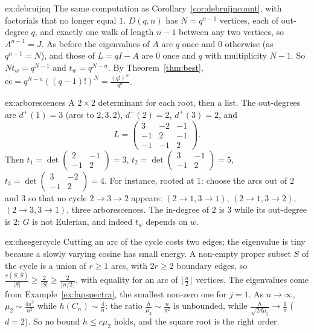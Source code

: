 \begin{solution}{ex:debruijnq}
\idea The same computation as Corollary~\ref{cor:debruijncount}, with factorials that no longer equal $1$.
\writeup $D(q,n)$ has $N=q^{n-1}$ vertices, each of out-degree $q$, and exactly one walk of length $n-1$ between any two vertices, so $A^{n-1}=J$. As before the eigenvalues of $A$ are $q$ once and $0$ otherwise
(as $q^{n-1}=N$), and those of $L=qI-A$ are $0$ once and $q$ with multiplicity $N-1$. So $Nt_w=q^{N-1}$ and $t_w=q^{N-n}$. By Theorem~\ref{thm:best}, $\mathrm{ec}=q^{N-n}((q-1)!)^N=\frac{(q!)^N}{q^n}$.
\end{solution}

\begin{solution}{ex:arborescences}
\idea A $2\times2$ determinant for each root, then a list.
\writeup The out-degrees are $d^+(1)=3$ (arcs to $2,3,2$), $d^+(2)=2$, $d^+(3)=2$, and
\[
L=\begin{pmatrix}3&-2&-1\\-1&2&-1\\-1&-1&2\end{pmatrix}.
\]
Then $t_1=\det\begin{pmatrix}2&-1\\-1&2\end{pmatrix}=3$, $t_2=\det\begin{pmatrix}3&-1\\-1&2\end{pmatrix}=5$, $t_3=\det\begin{pmatrix}3&-2\\-1&2\end{pmatrix}=4$. For instance, rooted at $1$: choose the arcs out of $2$ and $3$ so that no cycle $2\to3\to2$
appears: $(2\to1,3\to1)$, $(2\to1,3\to2)$, $(2\to3,3\to1)$, three arborescences. The in-degree of $2$ is $3$ while its out-degree is $2$: $G$ is not Eulerian, and indeed $t_w$ depends on $w$.
\end{solution}

\begin{solution}{ex:cheegercycle}
\idea Cutting an arc of the cycle costs two edges; the eigenvalue is tiny because a slowly varying cosine has small energy.
\writeup A non-empty proper subset $S$ of the cycle is a union of $r\ge1$ arcs, with $2r\ge2$ boundary edges, so $\frac{e(S,\bar S)}{|S|}\ge\frac2{|S|}\ge\frac2{\lfloor n/2\rfloor}$, with equality for an arc of $\lfloor\frac n2\rfloor$ vertices. The
eigenvalues come from Example~\ref{ex:lapspectra}, the smallest non-zero one for $j=1$. As $n\to\infty$, $\mu_2\sim\frac{4\pi^2}{n^2}$ while $h(C_n)\sim\frac4n$: the ratio $\frac h{\mu_2}\sim\frac n{\pi^2}$ is unbounded, while
$\frac h{\sqrt{2d\mu_2}}\to\frac1\pi$ ($d=2$). So no bound $h\le c\mu_2$ holds, and the square root is the right order.
\end{solution}

